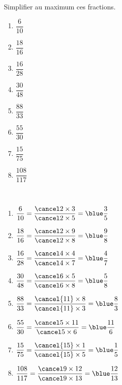 \begin{exercice*}
   Simplifier au maximum ces fractions. \medskip
   \begin{multicols}{4}
      \begin{spacing}{2}
         \begin{enumerate}
            \item $\dfrac{6}{10}$
            \item $\dfrac{18}{16}$
            \columnbreak
            \item $\dfrac{16}{28}$
            \item $\dfrac{30}{48}$
            \columnbreak
            \item $\dfrac{88}{33}$
            \item $\dfrac{55}{30}$
            \columnbreak
            \item $\dfrac{15}{75}$
            \item $\dfrac{108}{117}$
         \end{enumerate}
      \end{spacing}
   \end{multicols}
\end{exercice*}
\begin{corrige}
   \phantom{rrr}\\
   \begin{spacing}{2}
      \begin{enumerate}
         \item $\dfrac{6}{10} =\dfrac{\cancel2\times3}{\cancel2\times5} =\blue\dfrac35$ \bigskip
         \item $\dfrac{18}{16} =\dfrac{\cancel2\times9}{\cancel2\times8} =\blue\dfrac98$ \bigskip
         \item $\dfrac{16}{28} =\dfrac{\cancel4\times4}{\cancel4\times7} =\blue\dfrac47$ \bigskip
         \item $\dfrac{30}{48} =\dfrac{\cancel6\times5}{\cancel6\times8} =\blue\dfrac58$ \bigskip
         \item $\dfrac{88}{33} =\dfrac{\cancel{11}\times8}{\cancel{11}\times3} =\blue\dfrac83$ \bigskip
         \item $\dfrac{55}{30} =\dfrac{\cancel5\times11}{\cancel5\times6} =\blue\dfrac{11}6$ \bigskip
         \item $\dfrac{15}{75} =\dfrac{\cancel{15}\times1}{\cancel{15}\times5} =\blue\dfrac15$ \bigskip
         \item $\dfrac{108}{117} =\dfrac{\cancel9\times12}{\cancel9\times13} =\blue\dfrac{12}{13}$
      \end{enumerate}
   \end{spacing}
\end{corrige}